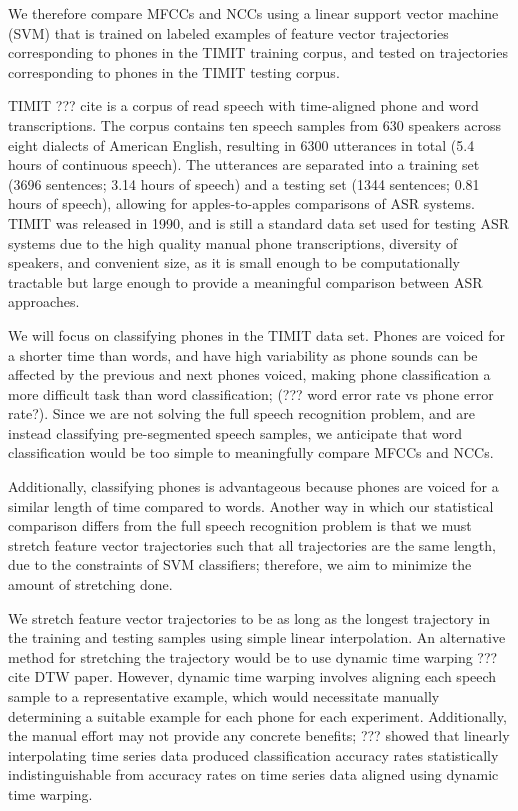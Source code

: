 We therefore compare MFCCs and NCCs
using a linear support vector machine (SVM)
that is trained on labeled
examples of feature vector trajectories
corresponding to phones
in the TIMIT training corpus,
and tested on trajectories
corresponding to phones
in the TIMIT testing corpus.

TIMIT ??? cite is a corpus of read speech
with time-aligned phone and word transcriptions.
The corpus contains ten speech samples
from 630 speakers across eight dialects
of American English,
resulting in 6300 utterances in total
(5.4 hours of continuous speech).
The utterances are separated into
a training set
(3696 sentences; 3.14 hours of speech)
and a testing set
(1344 sentences; 0.81 hours of speech),
allowing for apples-to-apples
comparisons of ASR systems.
TIMIT was released in 1990,
and is still a standard data set used
for testing ASR systems
due to the high quality
manual phone transcriptions,
diversity of speakers,
and convenient size,
as it is small enough to be
computationally tractable
but large enough to
provide a meaningful comparison
between ASR approaches.

We will focus on classifying
phones in the TIMIT data set.
Phones are voiced
for a shorter time than words,
and have high variability
as phone sounds can be affected
by the previous and next phones voiced,
making phone classification
a more difficult task than word classification;
(??? word error rate vs phone error rate?).
Since we are not solving the full
speech recognition problem,
and are instead classifying
pre-segmented speech samples,
we anticipate that word classification
would be too simple to meaningfully
compare MFCCs and NCCs.

Additionally, classifying phones
is advantageous because phones
are voiced for a similar length of time
compared to words.
Another way in which our statistical comparison
differs from the full speech recognition problem
is that we must stretch
feature vector trajectories
such that all trajectories are the same length,
due to the constraints of SVM classifiers;
therefore,
we aim to minimize the amount
of stretching done.

We stretch feature vector trajectories
to be as long as the longest trajectory
in the training and testing samples
using simple linear interpolation.
An alternative method
for stretching the trajectory
would be to use dynamic time warping
??? cite DTW paper.
However, dynamic time warping
involves aligning each speech sample
to a representative example,
which would necessitate manually
determining a suitable example
for each phone for each experiment.
Additionally, the manual effort may not
provide any concrete benefits;
??? showed that linearly interpolating
time series data
produced classification accuracy rates
statistically indistinguishable
from accuracy rates on time series data
aligned using dynamic time warping.

